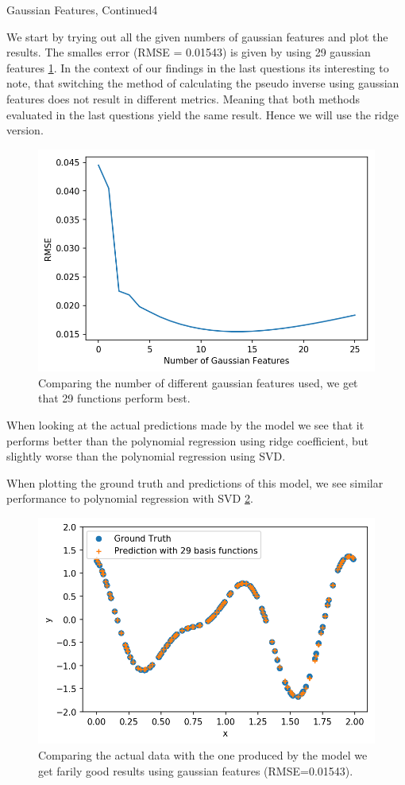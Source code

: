 \begin{questions}
\begin{question}{Gaussian Features, Continued}{4}
\begin{answer}\end{answer}
We start by trying out all the given numbers of gaussian features and plot the results. The smalles error (RMSE = 0.01543) is given by using 29 gaussian features \ref{fig:numberGaus}. In the context of our findings in the last questions its interesting to note, that switching the method of calculating the pseudo inverse using gaussian features does not result in different metrics. Meaning that both methods evaluated in the last questions yield the same result. Hence we will use the ridge version. 
\begin{figure}[H]
	\includegraphics[width=0.6\linewidth]{pictures/number_of_gaussian.png}
	\centering
	\caption{Comparing the number of different gaussian features used, we get that 29 functions perform best.}
	\label{fig:numberGaus}
\end{figure}

When looking at the actual predictions made by the model we see that it performs better than the polynomial regression using ridge coefficient, but slightly worse than the polynomial regression using SVD.

When plotting the ground truth and predictions of this model, we see similar performance to polynomial regression with SVD \ref{fig:gaus29}.
\begin{figure}[H]
	\includegraphics[width=0.5\linewidth]{pictures/groundTruth_gaus_29.png}
	\centering
	\caption{Comparing the actual data with the one produced by the model we get farily good results using gaussian features (RMSE=0.01543).}
	\label{fig:gaus29}
\end{figure}


\end{question}
\end{questions}
